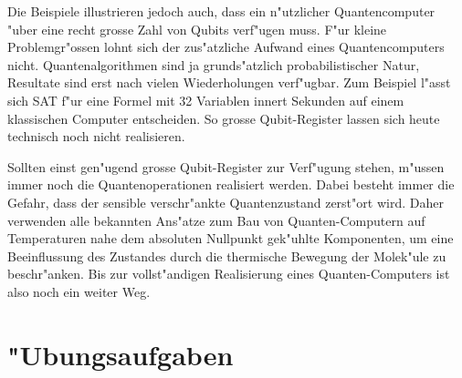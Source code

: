 Die Beispiele illustrieren jedoch auch, dass ein n"utzlicher
Quantencomputer "uber eine recht grosse Zahl von Qubits verf"ugen
muss.
F"ur kleine Problemgr"ossen lohnt sich der zus"atzliche Aufwand
eines Quantencomputers nicht.
Quantenalgorithmen sind ja grunds"atzlich probabilistischer
Natur, Resultate sind erst nach vielen Wiederholungen verf"ugbar.
Zum Beispiel l"asst sich SAT f"ur eine Formel mit 32 Variablen
innert Sekunden auf einem klassischen Computer entscheiden.
So grosse Qubit-Register lassen sich heute technisch noch nicht
realisieren.

Sollten einst gen"ugend grosse Qubit-Register zur Verf"ugung
stehen, m"ussen immer noch die Quantenoperationen realisiert
werden.
Dabei besteht immer die Gefahr, dass der sensible verschr"ankte
Quantenzustand zerst"ort wird.
Daher verwenden alle bekannten Ans"atze zum Bau von
Quanten-Computern auf Temperaturen nahe dem absoluten
Nullpunkt gek"uhlte Komponenten, um eine Beeinflussung des
Zustandes durch die thermische Bewegung der Molek"ule
zu beschr"anken.
Bis zur vollst"andigen Realisierung eines Quanten-Computers
ist also noch ein weiter Weg.

\section*{"Ubungsaufgaben}
\begin{uebungsaufgaben}
\item

\end{uebungsaufgaben}
